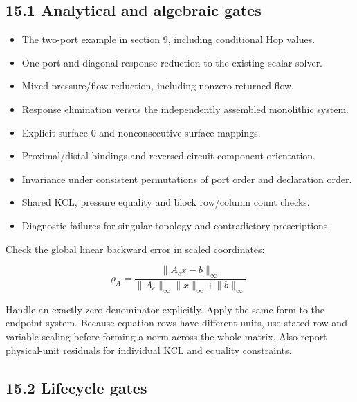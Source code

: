 \documentclass[11pt,a4paper]{article}
\begin{document}
\subsection{15.1 Analytical and algebraic gates}

\begin{itemize}
\item The two-port example in section 9, including conditional Hop values.


\item One-port and diagonal-response reduction to the existing scalar solver.


\item Mixed pressure/flow reduction, including nonzero returned flow.


\item Response elimination versus the independently assembled monolithic system.


\item Explicit surface 0 and nonconsecutive surface mappings.


\item Proximal/distal bindings and reversed circuit component orientation.


\item Invariance under consistent permutations of port order and declaration order.


\item Shared KCL, pressure equality and block row/column count checks.


\item Diagnostic failures for singular topology and contradictory prescriptions.


\end{itemize}
Check the global linear backward error in scaled coordinates:


\nopagebreak[3]
\[
\rho_A=\frac{\|A_cx-b\|_\infty}
{\|A_c\|_\infty\|x\|_\infty+\|b\|_\infty}.
\]


Handle an exactly zero denominator explicitly. Apply the same form to the endpoint system. Because equation rows have different units, use stated row and variable scaling before forming a norm across the whole matrix. Also report physical-unit residuals for individual KCL and equality constraints.

\subsection{15.2 Lifecycle gates}
\end{document}
